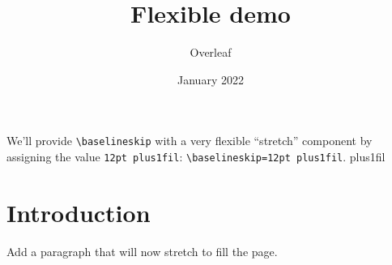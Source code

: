 \documentclass{article}
\title{Flexible \texttt{\string\baselineskip} demo}
\author{Overleaf}
\date{January 2022}
\begin{document}
	
	\maketitle
	We’ll provide \verb|\baselineskip| with a very flexible ``stretch'' component by assigning the value \texttt{12pt plus1fil}: \verb|\baselineskip=12pt plus1fil|.\baselineskip=12pt plus1fil 
	\section{Introduction}
	Add a paragraph that will now stretch to fill the page. \blindtext
	
\end{document}
